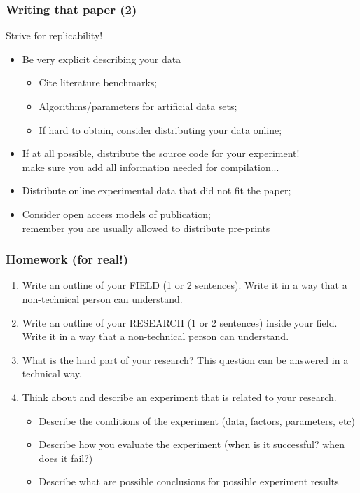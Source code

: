 \documentclass{beamer}
\begin{document}
\begin{frame}
  \frametitle{Writing that paper (2)}
  \begin{block}{Strive for replicability!}
    \begin{itemize}
    \item Be very explicit describing your data
      \begin{itemize}
        \item Cite literature benchmarks;
        \item Algorithms/parameters for artificial data sets;
        \item If hard to obtain, consider distributing your data
          online;
      \end{itemize}
      \medskip

    \item If at all possible, distribute the source code for your
      experiment!\\
      {\tiny make sure you add all information needed for compilation...}
      \medskip

    \item Distribute online experimental data that did not fit the
      paper;
      \medskip

    \item Consider open access models of publication;\\
      {\tiny remember you are usually allowed to distribute pre-prints}
    \end{itemize}
  \end{block}
\end{frame}

\begin{frame}
  \frametitle{Homework (for real!)}
    {\small
      \begin{enumerate}
      \item Write an outline of your FIELD (1 or 2 sentences). Write
        it in a way that a non-technical person can understand.

      \item Write an outline of your RESEARCH (1 or 2 sentences)
        inside your field. Write it in a way that a non-technical
        person can understand.


      \item What is the hard part of your research? This question can
        be answered in a technical way.

      \item Think about and describe an experiment that is related to
        your research.
        {\smaller
        \begin{itemize}
        \item Describe the conditions of the experiment (data,
          factors, parameters, etc)
        \item Describe how you evaluate the experiment (when is it
          successful? when does it fail?)
        \item Describe what are possible conclusions for possible experiment results 
        \end{itemize}}
      \end{enumerate}
    }
\end{frame}
\end{document}
